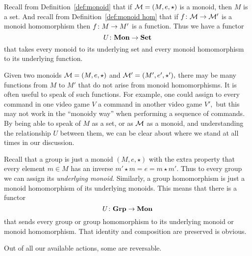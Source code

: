 \documentclass[../main/CT4S-EN-RU]{subfiles}
\begin{document}
\begin{definitionRUS}\label{def:functor}
\end{definitionRUS}

\begin{exampleENG}
Recall from Definition~\ref{def:monoid} that if $\mathcal{M}=(M,e,\star)$ is a monoid, then $M$ is a set. And recall from Definition~\ref{def:monoid hom} that if $f\colon\mathcal{M}\rightarrow\mathcal{M}'$ is a monoid homomorphism then $f\colon M\rightarrow M'$ is a function. Thus we have a functor $$U\colon{\mathbf{Mon}}\rightarrow{\mathbf{Set}}$$ that takes every monoid to its underlying set and every monoid homomorphism to its underlying function. 

Given two monoids $\mathcal{M}=(M,e,\star)$ and $\mathcal{M}'=(M',e',\star'),$ there may be many functions from $M$ to $M'$ that do not arise from monoid homomorphisms. It is often useful to speak of such functions. For example, one could assign to every command in one video game $V$ a command in another video game $V',$ but this may not work in the “monoidy way” when performing a sequence of commands. By being able to speak of $M$ as a set, or as $\mathcal{M}$ as a monoid, and understanding the relationship $U$ between them, we can be clear about where we stand at all times in our discussion.
\end{exampleENG}

\begin{exampleRUS}
\end{exampleRUS}

\begin{exampleENG}\label{ex:grp to monoid}
Recall that a group is just a monoid $(M,e,\star)$ with the extra property that every element $m\in M$ has an inverse $m'\star m=e=m\star m'.$ Thus to every group we can assign its {\em underlying monoid}. Similarly, a group homomorphism is just a monoid homomorphism of its underlying monoids. This means that there is a functor $$U\colon{\mathbf{Grp}}\rightarrow{\mathbf{Mon}}$$ that sends every group or group homomorphism to its underlying monoid or monoid homomorphism. That identity and composition are preserved is obvious.
\end{exampleENG}

\begin{exampleRUS}\label{ex:grp to monoid}
\end{exampleRUS}

\begin{sloganENG}
Out of all our available actions, some are reversable. 
\end{sloganENG}
\end{document}
